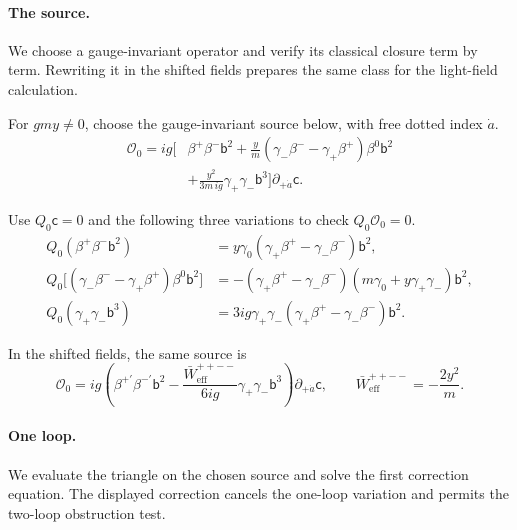 \documentclass[11pt]{article}
\numberwithin{equation}{section}
\numberwithin{figure}{section}
\numberwithin{table}{section}
\begin{document}
\begin{proofbox}
\paragraph{The source.}\label{the-source}

We choose a gauge-invariant operator and verify its classical closure term by term. Rewriting it in the shifted fields prepares the same class for the light-field calculation.

For $gmy\ne0$, choose the gauge-invariant source below, with free dotted index $\dot a$.
\begin{equation}\label{eq-SQEDsource}
\begin{aligned}
\mathcal O_0=ig\Big[&\beta^+\beta^-\mathsf b^2
+\frac ym(\gamma_-\beta^--\gamma_+\beta^+)\beta^0\mathsf b^2\\
&+\frac{y^2}{3m\,ig}\gamma_+\gamma_-\mathsf b^3\Big]
\partial_{+\dot a}\mathsf c .
\end{aligned}
\end{equation}

Use $Q_0\mathsf c=0$ and the following three variations to check $Q_0\mathcal O_0=0$.
\begin{equation}\label{eq-SQEDclosure}
\begin{aligned}
Q_0(\beta^+\beta^-\mathsf b^2)
&=y\gamma_0(\gamma_+\beta^+-\gamma_-\beta^-)\mathsf b^2,\\
Q_0\big[(\gamma_-\beta^--\gamma_+\beta^+)\beta^0\mathsf b^2\big]
&=-(\gamma_+\beta^+-\gamma_-\beta^-)
(m\gamma_0+y\gamma_+\gamma_-)\mathsf b^2,\\
Q_0(\gamma_+\gamma_-\mathsf b^3)
&=3ig\gamma_+\gamma_-(\gamma_+\beta^+-\gamma_-\beta^-)\mathsf b^2.
\end{aligned}
\end{equation}

In the shifted fields, the same source is
\begin{equation}\label{b-00783}
\mathcal O_0=ig\left(
\beta^{+\prime}\beta^{-\prime}\mathsf b^2
-\frac{\bar W_{\mathrm{eff}}^{++--}}{6ig}\gamma_+\gamma_-\mathsf b^3
\right)\partial_{+\dot a}\mathsf c,
\qquad
\bar W_{\mathrm{eff}}^{++--}=-\frac{2y^2}{m}.
\end{equation}

\paragraph{One loop.}\label{one-loop}

We evaluate the triangle on the chosen source and solve the first correction equation. The displayed correction cancels the one-loop variation and permits the two-loop obstruction test.


\end{proofbox}
\end{document}
